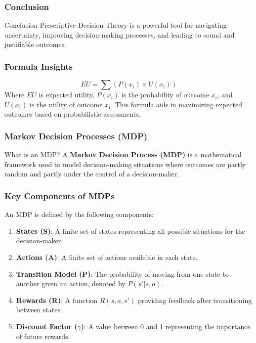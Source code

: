 \documentclass[aspectratio=169]{beamer}
\begin{document}
\begin{frame}[fragile]
    \frametitle{Conclusion}
    \begin{block}{Conclusion}
        Prescriptive Decision Theory is a powerful tool for navigating uncertainty, improving decision-making processes, and leading to sound and justifiable outcomes.
    \end{block}
\end{frame}

\begin{frame}[fragile]
    \frametitle{Formula Insights}
    \begin{equation}
        EU = \sum (P(x_i) \times U(x_i))
    \end{equation}
    Where \(EU\) is expected utility, \(P(x_i)\) is the probability of outcome \(x_i\), and \(U(x_i)\) is the utility of outcome \(x_i\). This formula aids in maximizing expected outcomes based on probabilistic assessments.
\end{frame}

\begin{frame}[fragile]
    \frametitle{Markov Decision Processes (MDP)}
    \begin{block}{What is an MDP?}
        A \textbf{Markov Decision Process (MDP)} is a mathematical framework used to model decision-making situations where outcomes are partly random and partly under the control of a decision-maker.
    \end{block}
\end{frame}

\begin{frame}[fragile]
    \frametitle{Key Components of MDPs}
    An MDP is defined by the following components:
    \begin{enumerate}
        \item \textbf{States (S)}: A finite set of states representing all possible situations for the decision-maker.  
        \item \textbf{Actions (A)}: A finite set of actions available in each state.
        \item \textbf{Transition Model (P)}: The probability of moving from one state to another given an action, denoted by \( P(s' | s, a) \).
        \item \textbf{Rewards (R)}: A function \( R(s, a, s') \) providing feedback after transitioning between states.
        \item \textbf{Discount Factor ($\gamma$)}: A value between 0 and 1 representing the importance of future rewards.
    \end{enumerate}
\end{frame}
\end{document}
